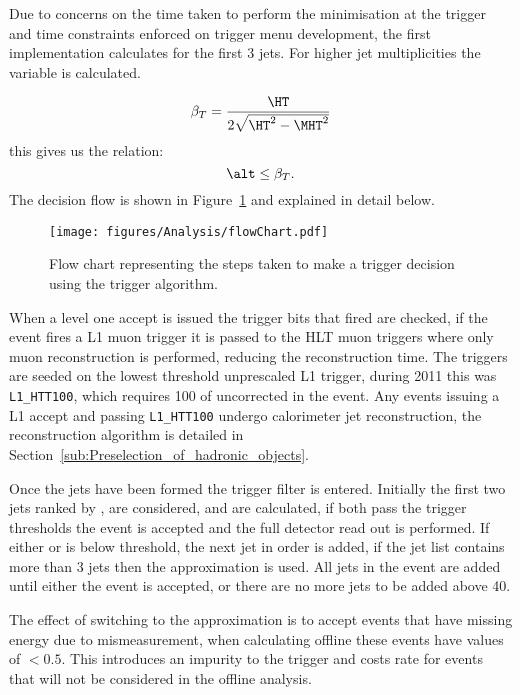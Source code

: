 Due to concerns on the time taken to perform the \dHT minimisation at the 
trigger and time constraints enforced on trigger menu development, the first 
implementation calculates \alt for the first 3 jets. For higher jet 
multiplicities the variable \bt is calculated.

\begin{equation}
  \beta_{T} = \frac{\HT}{2\sqrt{\HT^{2} - \MHT^{2}}}
  \label{eqn:betaT}
\end{equation}
this gives us the relation:
\begin{equation}
  \alt \leq \beta_{T}.
\end{equation}
The decision flow is shown in Figure~\ref{fig:figures_Analysis_flowChart} and 
explained in detail below.

\begin{figure}[ht|]
  \centering
    \texttt{[image: figures/Analysis/flowChart.pdf]}
  \caption{Flow chart representing the steps taken to make a trigger decision 
  using the \alt trigger algorithm.}
  \label{fig:figures_Analysis_flowChart}
\end{figure}


When a level one accept is issued the trigger bits that fired are checked, if 
the event fires a L1 muon trigger it is passed to the HLT muon triggers where 
only muon reconstruction is performed, reducing the reconstruction time. The 
\alt triggers are seeded on the lowest threshold unprescaled L1 \HT trigger, 
during 2011 this was \texttt{L1\_HTT100}, which requires \unit{100}{\GeV} of 
uncorrected \HT in the event. Any events issuing a L1 accept and passing 
\texttt{L1\_HTT100} undergo calorimeter jet reconstruction, the reconstruction 
algorithm is detailed in Section~\ref{sub:Preselection_of_hadronic_objects}.

Once the jets have been formed the trigger filter is entered. Initially the 
first two jets ranked by \ET, are considered, \HT and \alt are calculated, if 
both pass the trigger thresholds the event is accepted and the full detector 
read out is performed. If either \HT or \alt is below threshold, the next jet 
in \ET order is added, if the jet list contains more than 3 jets then the 
\bt approximation is used. All jets in the event are added until either the 
event is accepted, or there are no more jets to be added above \unit{40}{\GeV}.

The effect of switching to the \bt approximation is to accept events that have 
missing energy due to mismeasurement, when calculating \alt offline these 
events have values of \alt $< 0.5$. This introduces an impurity to the trigger 
and costs rate for events that will not be considered in the offline analysis.


